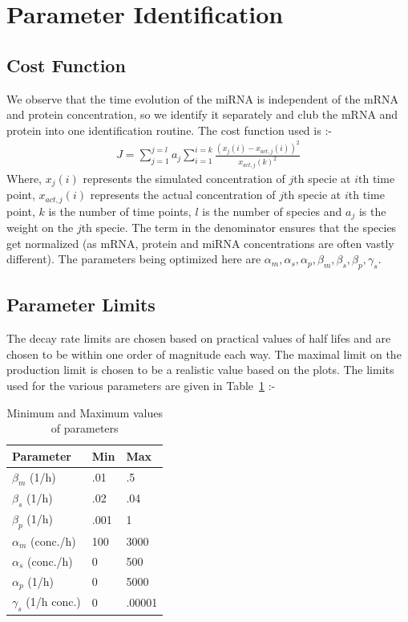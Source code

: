 \documentclass{article}
\begin{document}
\section{Parameter Identification}

\subsection{Cost Function}
We observe that the time evolution of the miRNA is independent of the mRNA and protein concentration, so we identify it separately and club the mRNA and protein into one identification routine.  The cost function used is :- 
\begin{align*}
J = \sum\limits_{j = 1}^{j = l}  a_j \sum\limits_{i = 1}^{i = k} \frac{{(x_{j}(i) - x_{act,j}(i))}^2}{{x_{act,j}(k)}^2} 
\end{align*}
Where, $x_j(i)$ represents the simulated concentration of $j$th specie at $i$th time point, $x_{act,j}(i)$ represents the actual concentration of $j$th specie at $i$th time point, $k$ is the number of time points, $l$ is the number of species and $a_j$ is the weight on the $j$th specie. The term in the denominator ensures that the species get normalized (as mRNA, protein and miRNA concentrations are often vastly different). The parameters being optimized here are $\alpha_m, \alpha_s, \alpha_p, \beta_m, \beta_s, \beta_p, \gamma_s$.   

\subsection{Parameter Limits}

The decay rate limits are chosen based on practical values of half lifes and are chosen to be within one order of magnitude each way. The maximal limit on the production limit is chosen to be a realistic value based on the plots. The limits used for the various parameters are given in Table~\ref{MinMaxTable} :- 

\begin{table}[h!]
\begin{center}
\begin{tabular}{|l|l|l|}
\hline
Parameter & Min & Max \\\hline
$\beta_m$ (1/h) &.01 &.5 \\\hline
$\beta_s$ (1/h) &.02 &.04 \\\hline 
$\beta_p$ (1/h) &.001 &1 \\\hline 
$\alpha_m$ (conc./h) &100 &3000 \\\hline
$\alpha_s$ (conc./h) &0 &500 \\\hline
$\alpha_p$ (1/h) &0 &5000 \\\hline
$\gamma_s$ (1/h conc.) &0 &.00001 \\\hline 
\end{tabular}
\end{center}
\caption{Minimum and Maximum values of parameters}
\label{MinMaxTable}
\end{table}
\end{document}
